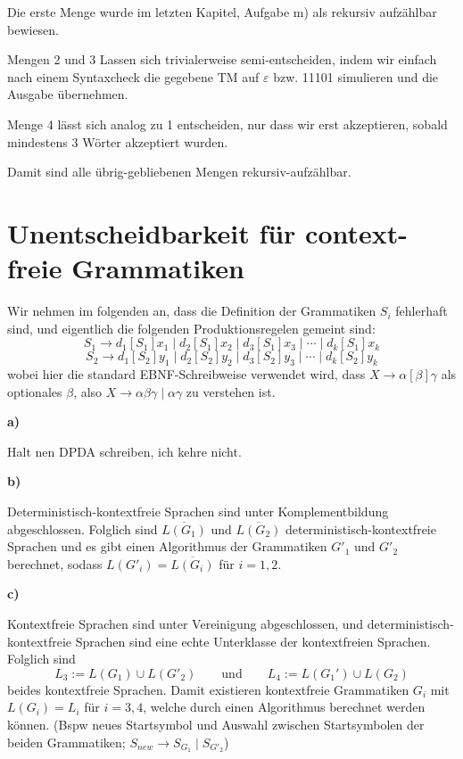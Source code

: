 \documentclass[a4paper,graphics,11pt]{article}
\newcommand{\eps}[0]{\varepsilon}
\begin{document}
Die erste Menge wurde im letzten Kapitel, Aufgabe m) als rekursiv aufzählbar bewiesen.

Mengen 2 und 3 Lassen sich trivialerweise semi-entscheiden, indem wir einfach nach einem Syntaxcheck
die gegebene TM auf $\eps$ bzw. 11101 simulieren und die Ausgabe übernehmen.

Menge 4 lässt sich analog zu 1 entscheiden, nur dass wir erst akzeptieren, sobald mindestens 3 Wörter
akzeptiert wurden.

Damit sind alle übrig-gebliebenen Mengen rekursiv-aufzählbar.

\newpage

\section{Unentscheidbarkeit für context-freie Grammatiken}

Wir nehmen im folgenden an, dass die Definition der Grammatiken $S_i$ fehlerhaft sind, und eigentlich die folgenden
Produktionsregelen gemeint sind:
$$
    S_1 \to d_1[S_1]x_1 \mid d_2[S_1]x_2 \mid d_3[S_1]x_3 \mid \cdots \mid d_k[S_1]x_k
$$$$
    S_2 \to d_1[S_2]y_1 \mid d_2[S_2]y_2 \mid d_3[S_2]y_3 \mid \cdots \mid d_k[S_2]y_k
$$
wobei hier die standard EBNF-Schreibweise verwendet wird, dass $X \to \alpha[\beta]\gamma$ als optionales
$\beta$, also $X \to \alpha\beta\gamma \mid \alpha\gamma$ zu verstehen ist.

\textbf{a)}

Halt nen DPDA schreiben, ich kehre nicht.

\strut

\textbf{b)}

Deterministisch-kontextfreie Sprachen sind unter Komplementbildung abgeschlossen. Folglich sind
$\overline{L(G_1)}$ und $\overline{L(G_2)}$ deterministisch-kontextfreie Sprachen und es gibt einen Algorithmus
der Grammatiken $G'_1$ und $G'_2$ berechnet, sodass $L(G'_i) = \overline{L(G_i)}$ für $i=1,2$.

\strut

\textbf{c)}

Kontextfreie Sprachen sind unter Vereinigung abgeschlossen, und deterministisch-kontextfreie Sprachen sind eine
echte Unterklasse der kontextfreien Sprachen. Folglich sind
$$
    L_3 := L(G_1) \cup L(G'_2)
    \qquad\text{und}\qquad
    L_4 := L(G_1') \cup L(G_2)
$$
beides kontextfreie Sprachen. Damit existieren kontextfreie Grammatiken $G_i$ mit $L(G_i) = L_i$ für $i=3,4$,
welche durch einen Algorithmus berechnet werden können. (Bspw neues Startsymbol und Auswahl zwischen
Startsymbolen der beiden Grammatiken; $S_{new} \to S_{G_1} \mid S_{G'_2}$)
\end{document}
